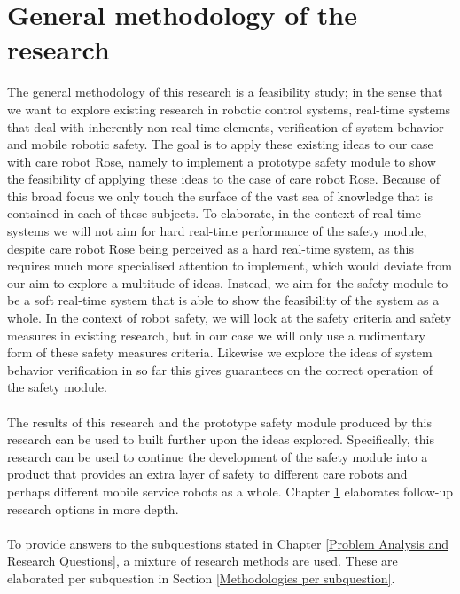 \documentclass[12pt]{scrreprt}
\begin{document}
\section{General methodology of the research}
The general methodology of this research is a feasibility study; in the sense that we want to explore existing research in robotic control systems, real-time systems that deal with inherently non-real-time elements, verification of system behavior and mobile robotic safety. The goal is to apply these existing ideas to our case with care robot Rose, namely to implement a prototype safety module to show the feasibility of applying these ideas to the case of care robot Rose. Because of this broad focus we only touch the surface of the vast sea of knowledge that is contained in each of these subjects. To elaborate, in the context of real-time systems we will not aim for hard real-time performance of the safety module, despite care robot Rose being perceived as a hard real-time system, as this requires much more specialised attention to implement, which would deviate from our aim to explore a multitude of ideas. Instead, we aim for the safety module to be a soft real-time system that is able to show the feasibility of the system as a whole. In the context of robot safety, we will look at the safety criteria and safety measures in existing research, but in our case we will only use a rudimentary form of these safety measures criteria. Likewise we explore the ideas of system behavior verification in so far this gives guarantees on the correct operation of the safety module.
\\\\
The results of this research and the prototype safety module produced by this research can be used to built further upon the ideas explored. Specifically, this research can be used to continue the development of the safety module into a product that provides an extra layer of safety to different care robots and perhaps different mobile service robots as a whole. Chapter \ref{} elaborates follow-up research options in more depth. 
\\\\
To provide answers to the subquestions stated in Chapter \ref{Problem Analysis and Research Questions}, a mixture of research methods are used. These are elaborated per subquestion in Section \ref{Methodologies per subquestion}.
\end{document}
